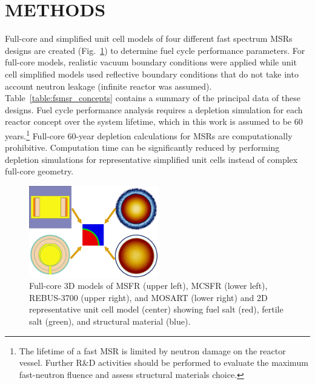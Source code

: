 \documentclass[letterpaper]{mandc2019}
\begin{document}
\section{METHODS}
\label{sec:methods}
Full-core and simplified unit cell models of four different fast spectrum \glspl{MSR} designs are created (Fig.~\ref{fig:unit_cell}) to determine fuel cycle performance parameters. 
For full-core models, realistic vacuum boundary conditions were applied  while unit cell simplified models used reflective boundary conditions that  do not take into account neutron leakage (infinite reactor was assumed). 
Table~\ref{table:fsmsr_concepts} contains a summary of the principal data of these designs. 
Fuel cycle performance analysis requires a depletion simulation for each reactor concept over the system lifetime, which in this work is assumed to be 60 years.\footnote{The lifetime of a fast \gls{MSR} is limited by neutron damage on the reactor vessel. 
Further R\&D activities should be performed to evaluate the maximum fast-neutron fluence and assess structural materials choice.} 
Full-core 60-year depletion calculations for \gls{MSR}s are computationally prohibitive. 
Computation time can be significantly reduced by performing depletion simulations for representative simplified unit cells instead of complex full-core geometry.
\begin{figure}[t!]
  \centering
    \vspace{-0.2in}
  \includegraphics[width=0.5\textwidth]{./Figures/fsmsrs.pdf}
  \caption{Full-core 3D models of \gls{MSFR} (upper left), \gls{MCSFR} (lower left), REBUS-3700 (upper right), and \gls{MOSART} (lower right) and 2D representative unit cell model (center) showing fuel salt (red), fertile salt (green), and structural material (blue).}
  \label{fig:unit_cell}
\end{figure}
\end{document}

